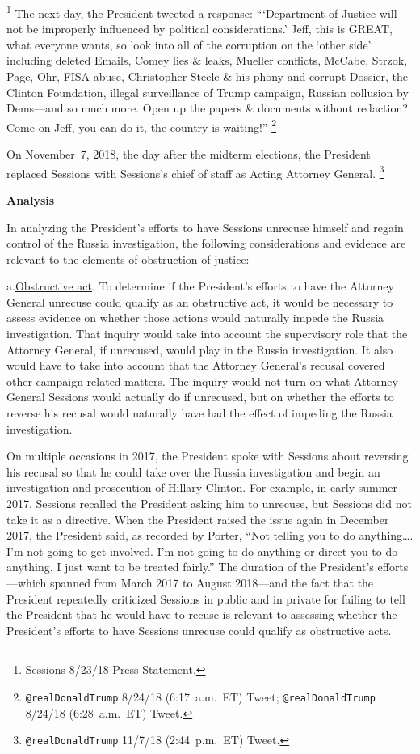 \footnote{Sessions 8/23/18 Press Statement.}
The next day, the President tweeted a response: ``\thinspace`Department of Justice will not be improperly influenced by political considerations.'
Jeff, this is GREAT, what everyone wants, so look into all of the corruption on the `other side' including deleted Emails, Comey lies \& leaks, Mueller conflicts, McCabe, Strzok, Page, Ohr, FISA abuse, Christopher Steele \& his phony and corrupt Dossier, the Clinton Foundation, illegal surveillance of Trump campaign, Russian collusion by Dems---and so much more.
Open up the papers \& documents without redaction? Come on Jeff, you can do it, the country is waiting!''%
\footnote{\verb+@realDonaldTrump+ 8/24/18 (6:17~a.m.~ET) Tweet;
\verb+@realDonaldTrump+ 8/24/18 (6:28~a.m.~ET) Tweet.}

On November~7, 2018, the day after the midterm elections, the President replaced Sessions with Sessions's chief of staff as Acting Attorney General.%
\footnote{\verb+@realDonaldTrump+ 11/7/18 (2:44~p.m.~ET) Tweet.}

\begin{center}
\textbf{Analysis}
\end{center}

In analyzing the President's efforts to have Sessions unrecuse himself and regain control of the Russia investigation, the following considerations and evidence are relevant to the elements of obstruction of justice:

a.\qquad\underline{Obstructive act}.
To determine if the President's efforts to have the Attorney General unrecuse could qualify as an obstructive act, it would be necessary to assess evidence on whether those actions would naturally impede the Russia investigation.
That inquiry would take into account the supervisory role that the Attorney General, if unrecused, would play in the Russia investigation.
It also would have to take into account that the Attorney General's recusal covered other campaign-related matters.
The inquiry would not turn on what Attorney General Sessions would actually do if unrecused, but on whether the efforts to reverse his recusal would naturally have had the effect of impeding the Russia investigation.

On multiple occasions in 2017, the President spoke with Sessions about reversing his recusal so that he could take over the Russia investigation and begin an investigation and prosecution of Hillary Clinton.
For example, in early summer 2017, Sessions recalled the President asking him to unrecuse, but Sessions did not take it as a directive.
When the President raised the issue again in December 2017, the President said, as recorded by Porter, ``Not telling you to do anything\dots.
I'm not going to get involved.
I'm not going to do anything or direct you to do anything.
I just want to be treated fairly.''
The duration of the President's efforts---which spanned from March 2017 to August 2018---and the fact that the President repeatedly criticized Sessions in public and in private for failing to tell the President that he would have to recuse is relevant to assessing whether the President's efforts to have Sessions unrecuse could qualify as obstructive acts.

